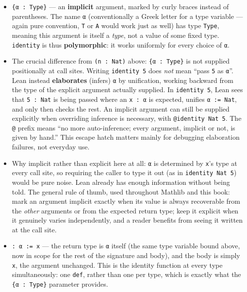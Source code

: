\begin{itemize}
\tightlist
\item
  \texttt{\{α : Type\}} --- an \textbf{implicit} argument, marked by curly braces instead of parentheses. The name \texttt{α} (conventionally a Greek letter for a type variable --- again pure convention, \texttt{T} or \texttt{A} would work just as well) has type \texttt{Type}, meaning this argument is itself a \emph{type}, not a value of some fixed type. \texttt{identity} is thus \textbf{polymorphic}: it works uniformly for every choice of \texttt{α}.
\item
  The crucial difference from \texttt{(n : Nat)} above: \texttt{\{α : Type\}} is not supplied positionally at call sites. Writing \texttt{identity 5} does \emph{not} mean ``pass \texttt{5} as \texttt{α}''. Lean instead \textbf{elaborates} (infers) \texttt{α} by unification, working backward from the type of the explicit argument actually supplied. In \texttt{identity 5}, Lean sees that \texttt{5 : Nat} is being passed where an \texttt{x : α} is expected, unifies \texttt{α := Nat}, and only then checks the rest. An implicit argument can still be supplied explicitly when overriding inference is necessary, with \texttt{@identity Nat 5}. The \texttt{@} prefix means ``no more auto-inference; every argument, implicit or not, is given by hand.'' This escape hatch matters mainly for debugging elaboration failures, not everyday use.
\item
  Why implicit rather than explicit here at all: \texttt{α} is determined by \texttt{x}'s type at every call site, so requiring the caller to type it out (as in \texttt{identity Nat 5}) would be pure noise. Lean already has enough information without being told. The general rule of thumb, used throughout Mathlib and this book: mark an argument implicit exactly when its value is always recoverable from the \emph{other} arguments or from the expected return type; keep it explicit when it genuinely varies independently, and a reader benefits from seeing it written at the call site.
\item
  \texttt{: α := x} --- the return type is \texttt{α} itself (the same type variable bound above, now in scope for the rest of the signature and body), and the body is simply \texttt{x}, the argument unchanged. This is the identity function at every type simultaneously: one \texttt{def}, rather than one per type, which is exactly what the \texttt{\{α : Type\}} parameter provides.
\end{itemize}

